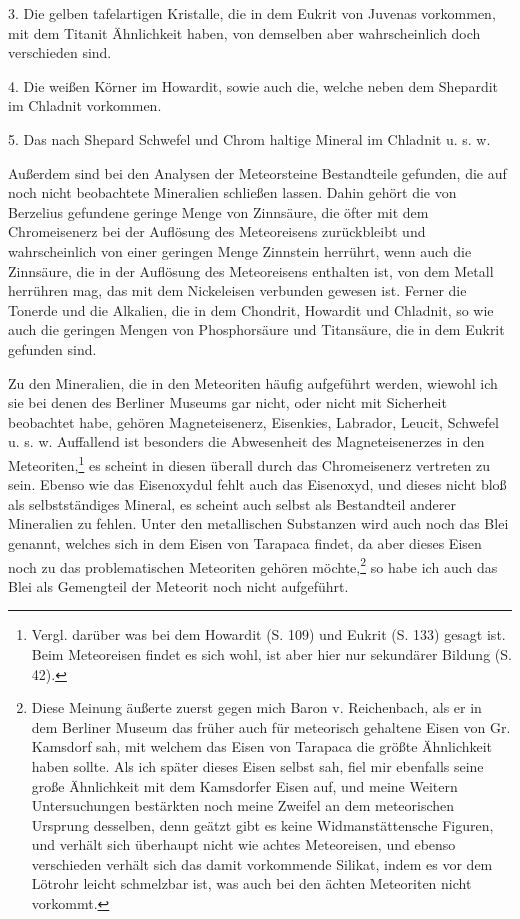 \documentclass[a4paper, 11pt, oneside]{article}
\begin{document}
3. Die gelben tafelartigen Kristalle, die in dem Eukrit von Juvenas vorkommen, mit dem Titanit Ähnlichkeit haben, von demselben aber wahrscheinlich doch verschieden sind.

4. Die weißen Körner im Howardit, sowie auch die, welche neben dem Shepardit im Chladnit vorkommen.

5. Das nach Shepard Schwefel und Chrom haltige Mineral im Chladnit u. s. w.

Außerdem sind bei den Analysen der Meteorsteine Bestandteile gefunden, die auf noch nicht beobachtete Mineralien schließen lassen. Dahin gehört die von Berzelius gefundene geringe Menge von Zinnsäure, die öfter mit dem Chromeisenerz bei der Auflösung des Meteoreisens zurückbleibt und wahrscheinlich von einer geringen Menge Zinnstein herrührt, wenn auch die Zinnsäure, die in der Auflösung des Meteoreisens enthalten ist, von dem Metall herrühren mag, das mit dem Nickeleisen verbunden gewesen ist. Ferner die Tonerde und die Alkalien, die in dem Chondrit, Howardit und Chladnit, so wie auch die geringen Mengen von Phosphorsäure und Titansäure, die in dem Eukrit gefunden sind.

Zu den Mineralien, die in den Meteoriten häufig aufgeführt werden, wiewohl ich sie bei denen des Berliner Museums gar nicht, oder nicht mit Sicherheit beobachtet habe, gehören Magneteisenerz, Eisenkies, Labrador, Leucit, Schwefel u. s. w. Auffallend ist besonders die Abwesenheit des Magneteisenerzes in den Meteoriten,\footnote{Vergl. darüber was bei dem Howardit (S. 109) und Eukrit (S. 133) gesagt ist. Beim Meteoreisen findet es sich wohl, ist aber hier nur sekundärer Bildung (S. 42).} es scheint in diesen überall durch das Chromeisenerz vertreten zu sein. Ebenso wie das Eisenoxydul fehlt auch das Eisenoxyd, und dieses nicht bloß als selbstständiges Mineral, es scheint auch selbst als Bestandteil anderer Mineralien zu fehlen. Unter den metallischen Substanzen wird auch noch das Blei genannt, welches sich in dem Eisen von Tarapaca findet, da aber dieses Eisen noch zu das problematischen Meteoriten gehören möchte,\footnote{Diese Meinung äußerte zuerst gegen mich Baron v. Reichenbach, als er in dem Berliner Museum das früher auch für meteorisch gehaltene Eisen von Gr. Kamsdorf sah, mit welchem das Eisen von Tarapaca die größte Ähnlichkeit haben sollte. Als ich später dieses Eisen selbst sah, fiel mir ebenfalls seine große Ähnlichkeit mit dem Kamsdorfer Eisen auf, und meine Weitern Untersuchungen bestärkten noch meine Zweifel an dem meteorischen Ursprung desselben, denn geätzt gibt es keine Widmanstättensche Figuren, und verhält sich überhaupt nicht wie achtes Meteoreisen, und ebenso verschieden verhält sich das damit vorkommende Silikat, indem es vor dem Lötrohr leicht schmelzbar ist, was auch bei den ächten Meteoriten nicht vorkommt.} so habe ich auch das Blei als Gemengteil der Meteorit noch nicht aufgeführt.
\end{document}
